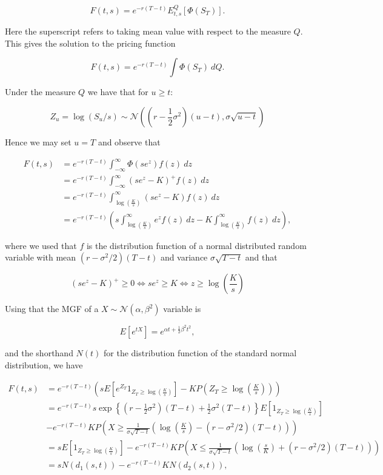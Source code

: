 \documentclass[
]{article}
\begin{document}
\[
F(t,s)=e^{-r(T-t)}E_{t,s}^Q[\Phi(S_T)].
\]

Here the superscript refers to taking mean value with respect to the
measure \(Q\). This gives the solution to the pricing function

\[
F(t,s)=e^{-r(T-t)}\int \Phi(S_T)\ dQ.
\]

Under the measure \(Q\) we have that for \(u\ge t\):

\[
Z_u=\log (S_u/s)\sim \mathcal{N}\left(\left(r-\frac{1}{2}\sigma^2\right)(u-t),\sigma\sqrt{u-t}\right)
\]

Hence we may set \(u=T\) and observe that

\begin{align*}
F(t,s)&=e^{-r(T-t)}\int_{-\infty}^\infty \Phi(se^z) f(z)\ dz\\
&=e^{-r(T-t)}\int_{-\infty}^\infty (se^z-K)^+ f(z)\ dz\\
&=e^{-r(T-t)}\int_{\log\left(\frac{K}{s}\right)}^{\infty} (se^z-K) f(z)\ dz\\
&=e^{-r(T-t)}\left(s\int_{\log\left(\frac{K}{s}\right)}^{\infty} e^z f(z)\ dz-K\int_{\log\left(\frac{K}{s}\right)}^{\infty} f(z)\ dz\right),
\end{align*}

where we used that \(f\) is the distribution function of a normal
distributed random variable with mean \((r-\sigma^2/2)(T-t)\) and
variance \(\sigma\sqrt{T-t}\) and that

\[
(se^z-K)^+ \ge 0\iff se^z\ge K\iff z\ge \log\left(\frac{K}{s}\right)
\]

Using that the MGF of a \(X\sim\mathcal{N}(\alpha, \beta^2)\) variable
is

\[
E[e^{tX}]=e^{\alpha t+\frac{1}{2}\beta ^2t^2},
\]

and the shorthand \(N(t)\) for the distribution function of the standard
normal distribution, we have

\begin{align*}
F(t,s)&=e^{-r(T-t)}\left(sE\left[e^{Z_T}1_{Z_T\ge \log\left(\frac{K}{s}\right)}\right]-K P\left(Z_T\ge \log\left(\frac{K}{s}\right)\right)\right)\\
&=e^{-r(T-t)}s\exp\left\{\left(r-\frac{1}{2}\sigma^2\right)(T-t)+\frac{1}{2}\sigma^2(T-t)\right\}E\left[1_{Z_T\ge \log\left(\frac{K}{s}\right)}\right]\\
&-e^{-r(T-t)}K P\left(X\ge\frac{1}{\sigma\sqrt{T-t}}\left( \log\left(\frac{K}{s}\right)-(r-\sigma^2/2)(T-t)\right)\right)\\
&=sE\left[1_{Z_T\ge \log\left(\frac{K}{s}\right)}\right]-e^{-r(T-t)}K P\left(X\le\frac{1}{\sigma\sqrt{T-t}}\left(\log\left(\frac{s}{K}\right)+(r-\sigma^2/2)(T-t)\right)\right)\\
&=sN(d_1(s,t))-e^{-r(T-t)}K N\left(d_2(s,t)\right),
\end{align*}
\end{document}

